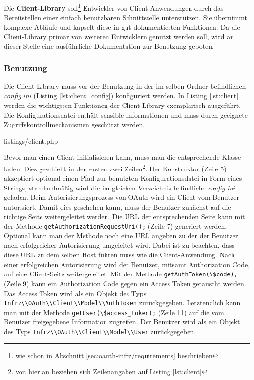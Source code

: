 \documentclass[12pt,a4paper,pointednumbers,abstracton]{scrartcl}
\newcommand{\code}[1]{\small\lstinline[style=InlinePHP]!#1!\normalsize}
\begin{document}
Die \textbf{Client-Library} soll\footnote{wie schon in Abschnitt \ref{sec:oauth-infrz/requirements} beschrieben} Entwickler von Client-Anwendungen durch das Bereitstellen einer einfach benutzbaren Schnittstelle unterstützen.
Sie übernimmt komplexe Abläufe und kapselt diese in gut dokumentierten Funktionen.
Da die Client-Library primär von weiteren Entwicklern genutzt werden soll, wird an dieser Stelle eine ausführliche Dokumentation zur Benutzung geboten.

\subsubsection{Benutzung}

Die Client-Library muss vor der Benutzung in der im selben Ordner befindlichen \emph{config.ini} (Listing \ref{lst:client_config}) konfiguriert werden.
In Listing \ref{lst:client} werden die wichtigsten Funktionen der Client-Library exemplarisch ausgeführt.
Die Konfigurationsdatei enthält sensible Informationen und muss durch geeignete Zugriffskontrollmechanismen geschützt werden.

\begin{minipage}{\textwidth}
	
	{listings/client.php}
\end{minipage}

Bevor man einen Client initialisieren kann, muss man die entsprechende Klasse laden.
Dies geschieht in den ersten zwei Zeilen\footnote{von hier an beziehen sich Zeilenangaben auf Listing \ref{lst:client}}.
Der Konstruktor (Zeile 5) akzeptiert optional einen Pfad zur benutzten Konfigurationsdatei in Form eines Strings, standardmäßig wird die im gleichen Verzeichnis befindliche \emph{config.ini} geladen.
Beim Autorisierungsprozess von OAuth wird ein Client vom Benutzer autorisiert.
Damit dies geschehen kann, muss der Benutzer zunächst auf die richtige Seite weitergeleitet werden.
Die URL der entsprechenden Seite kann mit der Methode \code{getAuthorizationRequestUri();} (Zeile 7) generiert werden.
Optional kann man der Methode noch eine URL angeben zu der der Benutzer nach erfolgreicher Autorisierung umgeleitet wird.
Dabei ist zu beachten, dass diese URL zu dem selben Host führen muss wie die Client-Anwendung.
Nach einer erfolgreichen Autorisierung wird der Benutzer, mitsamt Authorization Code, auf eine Client-Seite weitergeleitet.
Mit der Methode \code{getAuthToken(\$code);} (Zeile 9) kann ein Authorization Code gegen ein Access Token getauscht werden.
Das Access Token wird als ein Objekt des Typs \code{Infrz\\OAuth\\Client\\Model\\AuthToken} zurückgegeben.
Letztendlich kann man mit der Methode \code{getUser(\$access_token);} (Zeile 11) auf die vom Benutzer freigegebene Information zugreifen.
Der Benutzer wird als ein Objekt des Typs \code{Infrz\\OAuth\\Client\\Model\\User} zurückgegeben.
\end{document}
